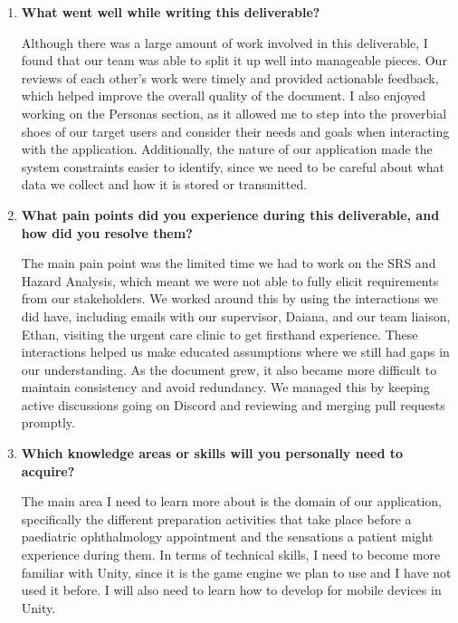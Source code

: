 \documentclass[12pt]{article}
\begin{document}
\begin{enumerate}

    \item \textbf{What went well while writing this deliverable?}

    Although there was a large amount of work involved in this deliverable,
    I found that our team was able to split it up well into manageable
    pieces. Our reviews of each other's work were timely and provided
    actionable feedback, which helped improve the overall quality of the
    document. I also enjoyed working on the Personas section, as it
    allowed me to step into the proverbial shoes of our target users and
    consider their needs and goals when interacting with the application.
    Additionally, the nature of our application made the system constraints
    easier to identify, since we need to be careful about what data we
    collect and how it is stored or transmitted.

    \item \textbf{What pain points did you experience during this
    deliverable, and how did you resolve them?}

    The main pain point was the limited time we had to work on the SRS
    and Hazard Analysis, which meant we were not able to fully elicit
    requirements from our stakeholders. We worked around this by using
    the interactions we did have, including emails with our supervisor,
    Daiana, and our team liaison, Ethan, visiting the urgent care clinic
    to get firsthand experience. These interactions helped us make
    educated assumptions where we still had gaps in our understanding.
    As the document grew, it also became more difficult to maintain
    consistency and avoid redundancy. We managed this by keeping active
    discussions going on Discord and reviewing and merging pull requests
    promptly.

    \setcounter{enumi}{4}

    \item \textbf{Which knowledge areas or skills will you personally
    need to acquire?}

    The main area I need to learn more about is the domain of our
    application, specifically the different preparation activities that
    take place before a paediatric ophthalmology appointment and the
    sensations a patient might experience during them. In terms of
    technical skills, I need to become more familiar with Unity, since
    it is the game engine we plan to use and I have not used it before.
    I will also need to learn how to develop for mobile devices in Unity.


\end{enumerate}
\end{document}
